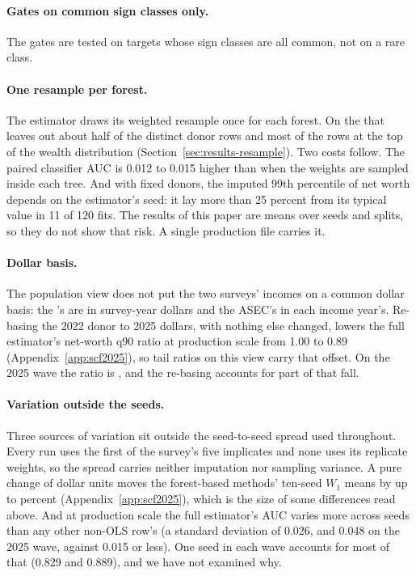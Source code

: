 \paragraph{Gates on common sign classes only.} The gates are tested on
targets whose sign classes are all common, not on a rare class.

\paragraph{One resample per forest.} The estimator draws its weighted
resample once for each forest. On the \scf{} that leaves out about half of
the distinct donor rows and most of the rows at the top of the wealth
distribution (Section~\ref{sec:results-resample}). Two costs follow. The
paired classifier AUC is 0.012 to 0.015 higher than when the weights are
sampled inside each tree. And with fixed donors, the imputed 99th percentile
of net worth depends on the estimator's seed: it lay more than 25 percent
from its typical value in 11 of 120 fits. The results of this paper are
means over seeds and splits, so they do not show that risk. A single
production file carries it.

\paragraph{Dollar basis.} The population view does not put the two surveys'
incomes on a common dollar basis: the \scf{}'s are in survey-year dollars
and the ASEC's in each income year's. Re-basing the 2022 donor to 2025
dollars, with nothing else changed, lowers the full estimator's net-worth
q90 ratio at production scale from 1.00 to 0.89
(Appendix~\ref{app:scf2025}), so tail ratios on this view carry that offset.
On the 2025 wave the ratio is , and the
re-basing accounts for part of that fall.

\paragraph{Variation outside the seeds.} Three sources of variation sit
outside the seed-to-seed spread used throughout. Every \scf{} run uses the
first of the survey's five implicates and none uses its replicate weights,
so the spread carries neither imputation nor sampling variance. A pure
change of dollar units moves the forest-based methods' ten-seed $W_1$ means
by up to  percent (Appendix~\ref{app:scf2025}), which
is the size of some differences read above. And at production scale the full
estimator's AUC varies more across seeds than any other non-OLS row's (a
standard deviation of 0.026, and 0.048 on the 2025 wave, against 0.015 or
less). One seed in each wave accounts for most of that (0.829 and 0.889),
and we have not examined why.

